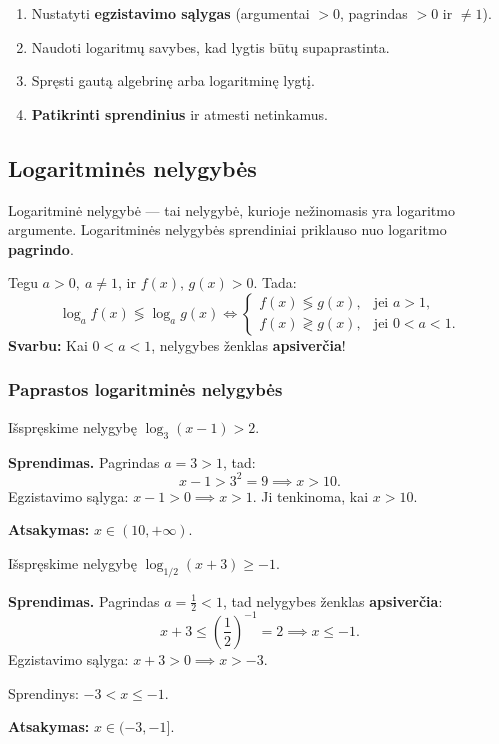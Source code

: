 \begin{tcolorbox}[title={Logaritminių lygčių sprendimo algoritmas}]
\begin{enumerate}
    \item Nustatyti \textbf{egzistavimo sąlygas} (argumentai $> 0$, pagrindas $> 0$ ir $\neq 1$).
    \item Naudoti logaritmų savybes, kad lygtis būtų supaprastinta.
    \item Spręsti gautą algebrinę arba logaritminę lygtį.
    \item \textbf{Patikrinti sprendinius} ir atmesti netinkamus.
\end{enumerate}
\end{tcolorbox}

\subsection{Logaritminės nelygybės}

Logaritminė nelygybė — tai nelygybė, kurioje nežinomasis yra logaritmo argumente. Logaritminės nelygybės sprendiniai priklauso nuo logaritmo \textbf{pagrindo}.

\begin{tcolorbox}[title={Pagrindinis principas}]
Tegu $a > 0,\ a \neq 1$, ir $f(x),\, g(x) > 0$. Tada:
\[
\log_a f(x) \lessgtr \log_a g(x) \iff
\begin{cases}
f(x) \lessgtr g(x), & \text{jei } a > 1, \\
f(x) \gtrless g(x), & \text{jei } 0 < a < 1.
\end{cases}
\]
\textbf{Svarbu:} Kai $0 < a < 1$, nelygybes ženklas \textbf{apsiverčia}!
\end{tcolorbox}

\subsubsection*{Paprastos logaritminės nelygybės}

\begin{example}
Išspręskime nelygybę $\log_3(x - 1) > 2$.

\textbf{Sprendimas.} Pagrindas $a = 3 > 1$, tad:
\[
x - 1 > 3^2 = 9 \implies x > 10.
\]
Egzistavimo sąlyga: $x - 1 > 0 \implies x > 1$. Ji tenkinoma, kai $x > 10$.

\textbf{Atsakymas:} $x \in (10, +\infty)$.
\end{example}

\begin{example}
Išspręskime nelygybę $\log_{1/2}(x + 3) \geq -1$.

\textbf{Sprendimas.} Pagrindas $a = \tfrac{1}{2} < 1$, tad nelygybes ženklas \textbf{apsiverčia}:
\[
x + 3 \leq \left(\frac{1}{2}\right)^{-1} = 2 \implies x \leq -1.
\]
Egzistavimo sąlyga: $x + 3 > 0 \implies x > -3$.

Sprendinys: $-3 < x \leq -1$.

\textbf{Atsakymas:} $x \in (-3, -1]$.
\end{example}

